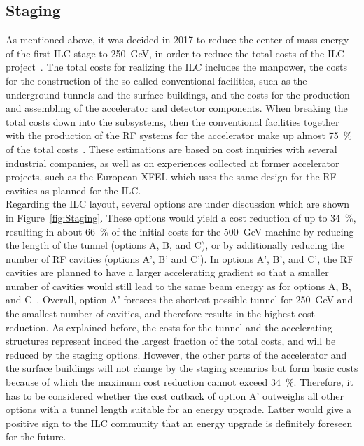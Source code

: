 \subsection{Staging}
As mentioned above, it was decided in 2017 to reduce the center-of-mass energy of the first ILC stage to \SI{250}{\GeV}, in order to reduce the total costs of the ILC project~\cite{ICFA_Statement}.
The total costs for realizing the ILC includes the manpower, the costs for the construction of the so-called conventional facilities, such as the underground tunnels and the surface buildings, and the costs for the production and assembling of the accelerator and detector components.
When breaking the total costs down into the subsystems, then the conventional facilities together with the production of the RF systems for the accelerator make up almost \SI{75}{\percent} of the total costs~\cite[p. 20f]{TDR1}.
These estimations are based on cost inquiries with several industrial companies, as well as on experiences collected at former accelerator projects, such as the European XFEL which uses the same design for the RF cavities as planned for the ILC.\\
Regarding the ILC layout, several options are under discussion which are shown in Figure~\ref{fig:Staging}.
These options would yield a cost reduction of up to \SI{34}{\percent}, resulting in about \SI{66}{\percent} of the initial costs for the \SI{500}{\GeV} machine by reducing the length of the tunnel (options A, B, and C), or by additionally reducing the number of RF cavities (options A', B' and C').
In options A', B', and C', the RF cavities are planned to have a larger accelerating gradient so that a smaller number of cavities would still lead to the same beam energy as for options A, B, and C~\cite{Cost_reduction}.
Overall, option A' foresees the shortest possible tunnel for \SI{250}{\GeV} and the smallest number of cavities, and therefore results in the highest cost reduction.
As explained before, the costs for the tunnel and the accelerating structures represent indeed the largest fraction of the total costs, and will be reduced by the staging options.
However, the other parts of the accelerator and the surface buildings will not change by the staging scenarios but form basic costs because of which the maximum cost reduction cannot exceed \SI{34}{\percent}.
Therefore, it has to be considered whether the cost cutback of option A' outweighs all other options with a tunnel length suitable for an energy upgrade.
Latter would give a positive sign to the ILC community that an energy upgrade is definitely foreseen for the future.
